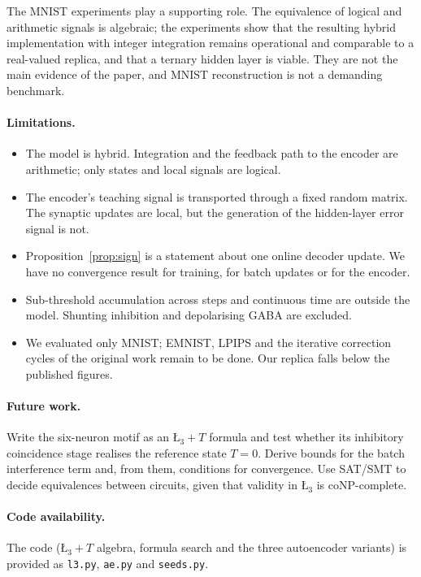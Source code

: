 \documentclass[11pt,a4paper]{article}
\theoremstyle{remark}
\newcommand{\Lt}{\text{\L}_3}
\newcommand{\LtT}{\text{\L}_3{+}T}
\begin{document}
The MNIST experiments play a supporting role. The equivalence of logical and arithmetic signals is algebraic; the experiments show that the resulting hybrid implementation with integer integration remains operational and comparable to a real-valued replica, and that a ternary hidden layer is viable. They are not the main evidence of the paper, and MNIST reconstruction is not a demanding benchmark.

\paragraph{Limitations.}
\begin{itemize}
\item The model is hybrid. Integration and the feedback path to the encoder are arithmetic; only states and local signals are logical.
\item The encoder's teaching signal is transported through a fixed random matrix. The synaptic updates are local, but the generation of the hidden-layer error signal is not.
\item Proposition~\ref{prop:sign} is a statement about one online decoder update. We have no convergence result for training, for batch updates or for the encoder.
\item Sub-threshold accumulation across steps and continuous time are outside the model. Shunting inhibition and depolarising GABA are excluded.
\item We evaluated only MNIST; EMNIST, LPIPS and the iterative correction cycles of the original work remain to be done. Our replica falls below the published figures.
\end{itemize}

\paragraph{Future work.} Write the six-neuron motif as an $\LtT$ formula and test whether its inhibitory coincidence stage realises the reference state $T=0$. Derive bounds for the batch interference term and, from them, conditions for convergence. Use SAT/SMT to decide equivalences between circuits, given that validity in $\Lt$ is coNP-complete.

\paragraph{Code availability.} The code ($\LtT$ algebra, formula search and the three autoencoder variants) is provided as \texttt{l3.py}, \texttt{ae.py} and \texttt{seeds.py}.
\end{document}
